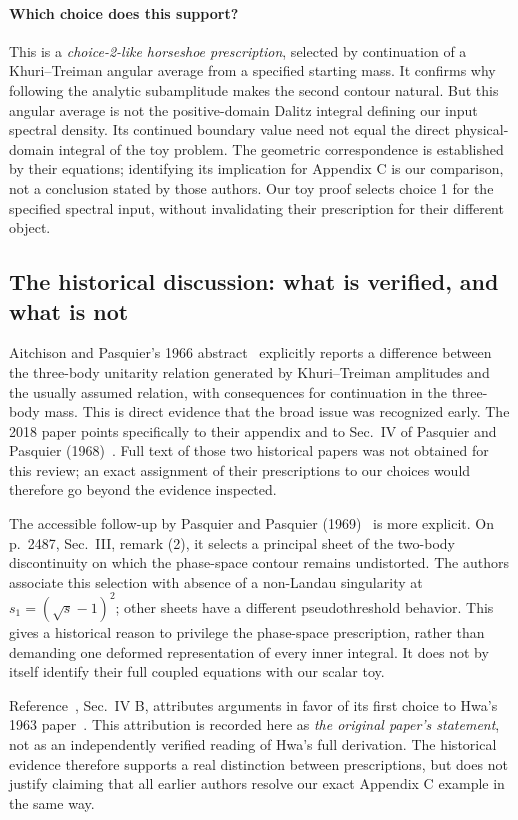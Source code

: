 \documentclass[11pt,a4paper]{article}
\begin{document}
\paragraph{Which choice does this support?}
This is a \emph{choice-2-like horseshoe prescription}, selected by continuation of a Khuri--Treiman angular average from a specified starting mass. It confirms why following the analytic subamplitude makes the second contour natural. But this angular average is not the positive-domain Dalitz integral defining our input spectral density. Its continued boundary value need not equal the direct physical-domain integral of the toy problem. The geometric correspondence is established by their equations; identifying its implication for Appendix C is our comparison, not a conclusion stated by those authors. Our toy proof selects choice 1 for the specified spectral input, without invalidating their prescription for their different object.

\subsection{The historical discussion: what is verified, and what is not}
Aitchison and Pasquier's 1966 abstract~\cite{aitchison} explicitly reports a difference between the three-body unitarity relation generated by Khuri--Treiman amplitudes and the usually assumed relation, with consequences for continuation in the three-body mass. This is direct evidence that the broad issue was recognized early. The 2018 paper points specifically to their appendix and to Sec.~IV of Pasquier and Pasquier (1968)~\cite{pasquier}. Full text of those two historical papers was not obtained for this review; an exact assignment of their prescriptions to our choices would therefore go beyond the evidence inspected.

The accessible follow-up by Pasquier and Pasquier (1969)~\cite{pasquierII} is more explicit. On p.~2487, Sec.~III, remark (2), it selects a principal sheet of the two-body discontinuity on which the phase-space contour remains undistorted. The authors associate this selection with absence of a non-Landau singularity at $s_1=(\sqrt{s}-1)^2$; other sheets have a different pseudothreshold behavior. This gives a historical reason to privilege the phase-space prescription, rather than demanding one deformed representation of every inner integral. It does not by itself identify their full coupled equations with our scalar toy.

Reference~\cite{paper}, Sec.~IV B, attributes arguments in favor of its first choice to Hwa's 1963 paper~\cite{hwa}. This attribution is recorded here as \emph{the original paper's statement}, not as an independently verified reading of Hwa's full derivation. The historical evidence therefore supports a real distinction between prescriptions, but does not justify claiming that all earlier authors resolve our exact Appendix C example in the same way.
\end{document}
